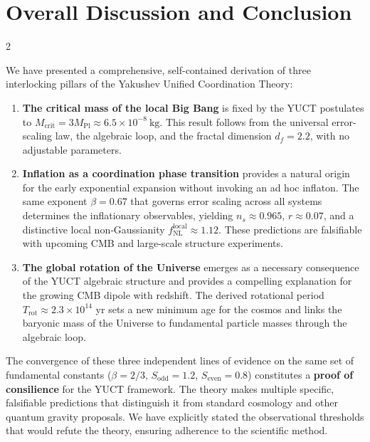 \documentclass[12pt,a4paper]{article}
\begin{document}
	\part{Overall Discussion and Conclusion}
	\label{part:conclusion}
	
	\begin{multicols}{2}
		
		We have presented a comprehensive, self-contained derivation of three interlocking pillars of the Yakushev Unified Coordination Theory:
		
		\begin{enumerate}
			\item \textbf{The critical mass of the local Big Bang} is fixed by the YUCT postulates to \(M_{\mathrm{crit}} = 3 M_{\mathrm{Pl}} \approx 6.5 \times 10^{-8}\ \text{kg}\). This result follows from the universal error-scaling law, the algebraic loop, and the fractal dimension \(d_f = 2.2\), with no adjustable parameters.
			
			\item \textbf{Inflation as a coordination phase transition} provides a natural origin for the early exponential expansion without invoking an ad hoc inflaton. The same exponent \(\beta = 0.67\) that governs error scaling across all systems determines the inflationary observables, yielding \(n_s \approx 0.965\), \(r \approx 0.07\), and a distinctive local non‑Gaussianity \(f_{\mathrm{NL}}^{\mathrm{local}} \approx 1.12\). These predictions are falsifiable with upcoming CMB and large-scale structure experiments.
			
			\item \textbf{The global rotation of the Universe} emerges as a necessary consequence of the YUCT algebraic structure and provides a compelling explanation for the growing CMB dipole with redshift. The derived rotational period \(T_{\mathrm{rot}} \approx 2.3 \times 10^{14}\) yr sets a new minimum age for the cosmos and links the baryonic mass of the Universe to fundamental particle masses through the algebraic loop.
		\end{enumerate}
		
		The convergence of these three independent lines of evidence on the same set of fundamental constants (\(\beta = 2/3\), \(S_{\mathrm{odd}}=1.2\), \(S_{\mathrm{even}}=0.8\)) constitutes a \textbf{proof of consilience} for the YUCT framework. The theory makes multiple specific, falsifiable predictions that distinguish it from standard cosmology and other quantum gravity proposals. We have explicitly stated the observational thresholds that would refute the theory, ensuring adherence to the scientific method.
		

\end{multicols}
\end{document}
